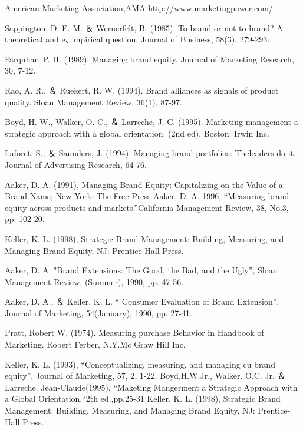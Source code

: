 \documentclass[a4paper,12pt]{report}
\begin{document}
\begin{thebibliography}{1}


American Marketing Association,AMA http://www.marketingpower.com/

Sappington, D. E. M. ＆  Wernerfelt, B. (1985). To brand or not to brand? A theoretical and e、mpirical question. Journal of Business, 58(3), 279-293.

Farquhar, P. H. (1989). Managing brand equity. Journal of Marketing Research, 30, 7-12.

Rao, A. R., ＆ Ruekert, R. W. (1994). Brand alliances as signals of product quality. Sloan Management Review, 36(1), 87-97.

Boyd, H. W., Walker, O. C., ＆ Larreche, J. C. (1995). Marketing management a
strategic approach with a global orientation. (2nd ed), Boston: Irwin Inc.

Laforet, S., ＆ Saunders, J. (1994). Managing brand portfolios: Theleaders do it. Journal of Advertising Research, 64-76.

Aaker, D. A. (1991), Managing Brand Equity: Capitalizing on the Value of a Brand Name, New
York: The Free Press
Aaker, D. A. 1996, “Measuring brand equity across products and markets.”California Management Review, 38, No.3, pp. 102-20.

Keller, K. L. (1998), Strategic Brand Management: Building, Measuring, and Managing
Brand Equity, NJ: Prentice-Hall Press.

Aaker, D. A. "Brand Extensions: The Good, the Bad, and the Ugly”, Sloan 
Management Review, (Summer), 1990, pp. 47-56. 

Aaker, D. A.,  ＆ Keller, K. L. “
Consumer Evaluation of Brand Extension”, 
Journal of Marketing, 54(January), 1990, pp. 27-41.

Pratt, Robert W. (1974). Measuring purchase Behavior in Handbook of Marketing. Robert Ferber, N.Y.Mc Graw Hill Inc.

Keller, K. L. (1993), “Conceptualizing, measuring, and managing cu
brand equity”, Journal of Marketing, 57, 2, 1-22. 
Boyd,H.W.Jr., Walker. O.C. Jr. ＆Larreche. Jean-Claude(1995), “Maketing Mangerment a Strategic Approach with a Global Orientation,“2th ed.,pp.25-31
Keller, K. L. (1998), Strategic Brand Management: Building, Measuring, and Managing
Brand Equity, NJ: Prentice-Hall Press.


\end{thebibliography}
\end{document}
